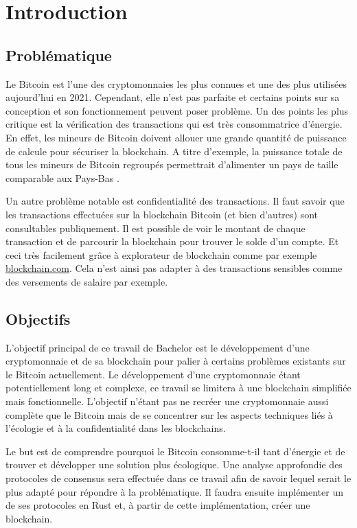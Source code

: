 \chapter{Introduction}
\label{ch:intro}

\section{Problématique}

Le Bitcoin est l'une des cryptomonnaies les plus connues et une des plus utilisées aujourd'hui en 2021. Cependant, elle n'est pas parfaite et certains points sur sa conception et son fonctionnement peuvent poser problème. Un des points les plus critique est la vérification des transactions qui est très consommatrice d'énergie. En effet, les mineurs de Bitcoin doivent allouer une grande quantité de puissance de calcule pour sécuriser la blockchain. A titre d'exemple, la puissance totale de tous les mineurs de Bitcoin regroupés permettrait d'alimenter un pays de taille comparable aux Pays-Bas \cite{BTC_cons}. 

Un autre problème notable est confidentialité des transactions. Il faut savoir que les transactions effectuées sur la blockchain Bitcoin (et bien d'autres) sont consultables publiquement. Il est possible de voir le montant de chaque transaction et de parcourir la blockchain pour trouver le solde d'un compte. Et ceci très facilement grâce à explorateur de blockchain comme par exemple \url{blockchain.com}. Cela n'est ainsi pas adapter à des transactions sensibles comme des versements de salaire par exemple.

\section{Objectifs}

L'objectif principal de ce travail de Bachelor est le développement d'une cryptomonnaie et de sa blockchain pour palier à certains problèmes existants sur le Bitcoin actuellement. Le développement d'une cryptomonnaie étant potentiellement long et complexe, ce travail se limitera à une blockchain simplifiée mais fonctionnelle. L'objectif n'étant pas ne recréer une cryptomonnaie aussi complète que le Bitcoin mais de se concentrer sur les aspects techniques liés à l'écologie et à la confidentialité dans les blockchains.

Le but est de comprendre pourquoi le Bitcoin consomme-t-il tant d'énergie et de trouver et développer une solution plus écologique. Une analyse approfondie des protocoles de consensus sera effectuée dans ce travail afin de savoir lequel serait le plus adapté pour répondre à la problématique. Il faudra ensuite implémenter un de ses protocoles en Rust et, à partir de cette implémentation, créer une blockchain.

